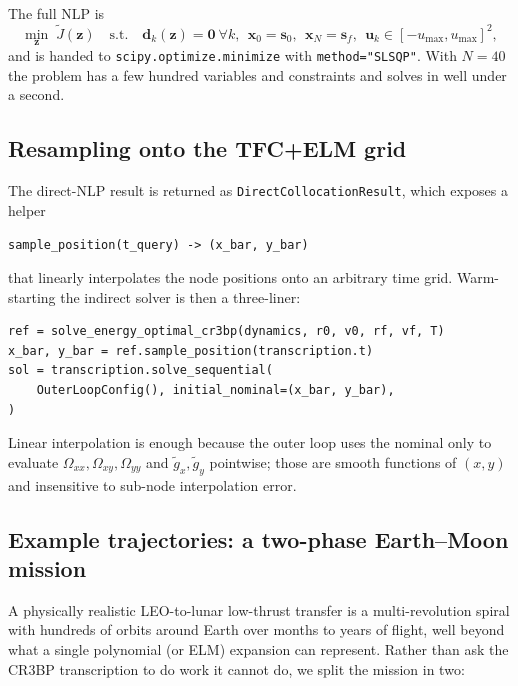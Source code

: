 \documentclass[8pt,a4paper]{article}
\newcommand{\bvec}[1]{\bm{#1}}
\newcommand{\xvec}{\bvec{x}}
\newcommand{\uvec}{\bvec{u}}
\newcommand{\Omegaxx}{\Omega_{xx}}
\newcommand{\Omegayy}{\Omega_{yy}}
\newcommand{\Omegaxy}{\Omega_{xy}}
\theoremstyle{definition}
\theoremstyle{remark}
\begin{document}
The full NLP is
\begin{equation}
  \min_{\bvec z}\; \tilde J(\bvec z)
  \quad \text{s.t.}\quad
  \bvec d_k(\bvec z) = \bm 0\ \forall k,\ \
  \xvec_0 = \bvec s_0,\ \
  \xvec_N = \bvec s_f,\ \
  \uvec_k \in [-u_{\max}, u_{\max}]^2,
\end{equation}
and is handed to \texttt{scipy.optimize.minimize} with
\texttt{method="SLSQP"}. With $N = 40$ the problem has a few hundred
variables and constraints and solves in well under a second.

\subsection{Resampling onto the TFC+ELM grid}

The direct-NLP result is returned as
\texttt{DirectCollocationResult}, which exposes a helper
\begin{center}
\texttt{sample\_position(t\_query) -> (x\_bar, y\_bar)}
\end{center}
that linearly interpolates the node positions onto an arbitrary time
grid. Warm-starting the indirect solver is then a three-liner:
\begin{lstlisting}[basicstyle=\ttfamily\small]
ref = solve_energy_optimal_cr3bp(dynamics, r0, v0, rf, vf, T)
x_bar, y_bar = ref.sample_position(transcription.t)
sol = transcription.solve_sequential(
    OuterLoopConfig(), initial_nominal=(x_bar, y_bar),
)
\end{lstlisting}
Linear interpolation is enough because the outer loop uses the
nominal only to evaluate $\Omegaxx, \Omegaxy, \Omegayy$ and
$\tilde g_x, \tilde g_y$ pointwise; those are smooth functions of
$(x, y)$ and insensitive to sub-node interpolation error.

\subsection{Example trajectories: a two-phase Earth--Moon mission}
\label{sec:example-trajectories}

A physically realistic LEO-to-lunar low-thrust transfer is a
multi-revolution spiral with hundreds of orbits around Earth over
months to years of flight, well beyond what a single polynomial (or
ELM) expansion can represent. Rather than ask the CR3BP
transcription to do work it cannot do, we split the mission in two:
\end{document}
